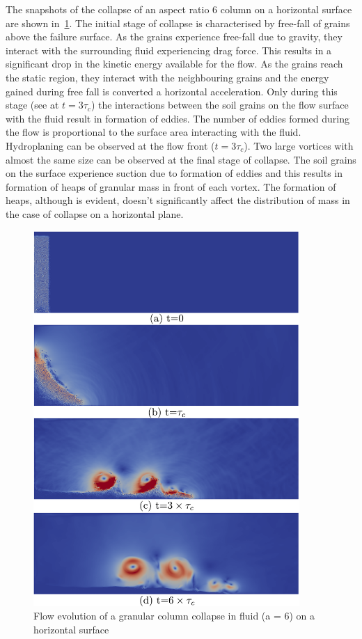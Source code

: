 The snapshots of the collapse of an aspect ratio 6 column on a horizontal 
surface are shown in~\cref{fig:LBM_DEM_a6}. The initial stage of collapse is 
characterised by free-fall of grains above the failure surface. As the grains 
experience free-fall due to gravity, they interact with the surrounding fluid 
experiencing drag force. This results in a significant drop in the kinetic 
energy available for the flow. As the grains reach the static region, they 
interact with the neighbouring grains and the energy gained during free fall is 
converted a horizontal acceleration. Only during this stage (see at $t = 
3\tau_c$) the interactions 
between the soil grains on the flow surface with the fluid result in formation 
of eddies. The number of eddies formed during the flow is proportional to the 
surface area interacting with the fluid. Hydroplaning can be observed at the 
flow front ($t = 3\tau_c$). Two large vortices with almost 
the same size can be observed at the final stage of collapse. The soil grains 
on the 
surface experience suction due to formation of eddies and this results in 
formation of heaps of granular mass in front of each vortex. The formation of 
heaps, 
although is evident, doesn't significantly affect the distribution of mass in 
the case of collapse on a horizontal plane. 

\begin{figure}[htpb]
\centering
\includegraphics[width=0.9\textwidth]{LBM_DEM_a6}
\caption{Flow evolution of a granular column collapse in fluid (a = 6) on a 
horizontal surface}
\label{fig:LBM_DEM_a6}
\end{figure}


